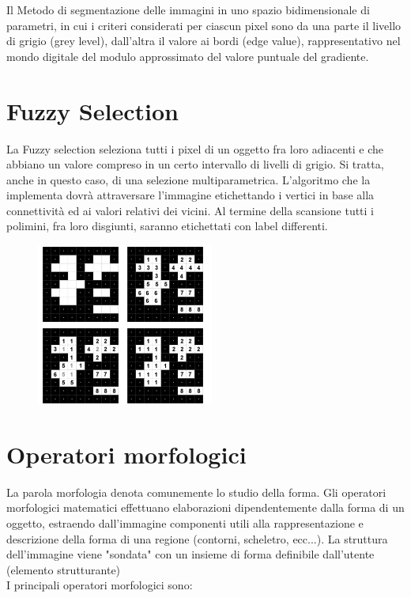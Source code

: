 Il Metodo di segmentazione delle immagini in uno spazio bidimensionale di parametri, in cui i criteri considerati per ciascun
pixel sono da una parte il livello di grigio (grey level), dall'altra il valore ai bordi (edge value), rappresentativo nel mondo digitale del
modulo approssimato del valore puntuale del gradiente.

\section{Fuzzy Selection}
La Fuzzy selection seleziona tutti i pixel di un oggetto fra loro adiacenti e che abbiano un valore compreso in un certo intervallo di livelli di grigio.
Si tratta, anche in questo caso, di una selezione multiparametrica. L'algoritmo che la implementa dovrà attraversare l'immagine etichettando i vertici in base alla connettività ed ai valori relativi dei vicini.
Al termine della scansione tutti i polimini, fra loro disgiunti, saranno etichettati con label differenti.

\begin{figure}[H]
    \centering
    \includegraphics[width=\linewidth, keepaspectratio]{capitoli/immagini/imgs/fuzzy-selection.png}
\end{figure}

\section{Operatori morfologici}
La parola morfologia denota comunemente lo studio della forma.
Gli operatori morfologici matematici effettuano elaborazioni dipendentemente dalla forma di un oggetto, estraendo
dall'immagine componenti utili alla rappresentazione e descrizione della forma di una regione (contorni, scheletro, ecc...).
La struttura dell'immagine viene "sondata" con un insieme di forma definibile dall'utente (elemento strutturante)
\\ I principali operatori morfologici sono:

